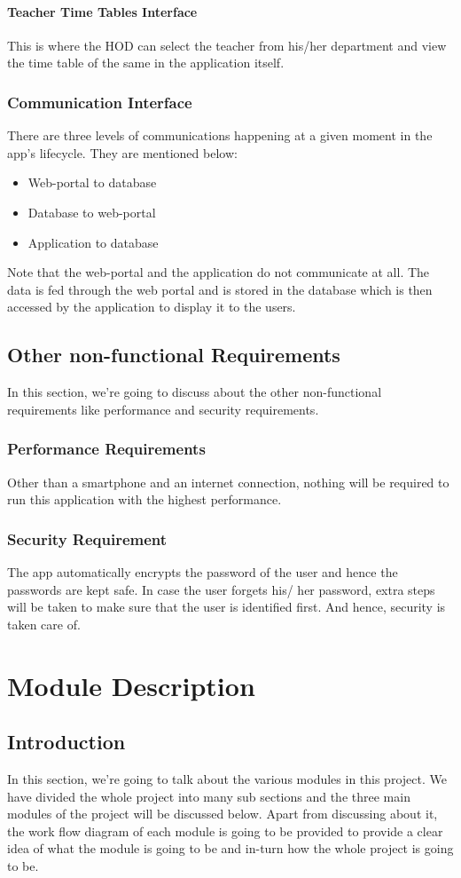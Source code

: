 \documentclass[BTech]{srmuthesis}
\begin{document}
\subsubsection{Teacher Time Tables Interface}
This is where the HOD can select the teacher from his/her department and view the time table of the same in the application itself.
\subsection{Communication Interface}
There are three levels of communications happening at a given moment in the app's lifecycle. They are mentioned below:
\begin{itemize}
\item Web-portal to database
\item Database to web-portal
\item Application to database
\end{itemize}
Note that the web-portal and the application do not communicate at all. The data is fed through the web portal and is stored in the database which is then accessed by the application to display it to the users. 
\section{Other non-functional Requirements}
In this section, we're going to discuss about the other non-functional requirements like performance and security requirements. 
\subsection{Performance Requirements}
Other than a smartphone and an internet connection, nothing will be required to run this application with the highest performance.
\subsection{Security Requirement}
The app automatically encrypts the password of the user and hence the passwords are kept safe. In case the user forgets his/ her password, extra steps will be taken to make sure that the user is identified first. And hence, security is taken care of.
\chapter{Module Description}
\section{Introduction}
In this section, we're going to talk about the various modules in this project. We have divided the whole project into many sub sections and the three main modules of the project will be discussed below. Apart from discussing about it, the work flow diagram of each module is going to be provided to provide a clear idea of what the module is going to be and in-turn how the whole project is going to be.
\end{document}
